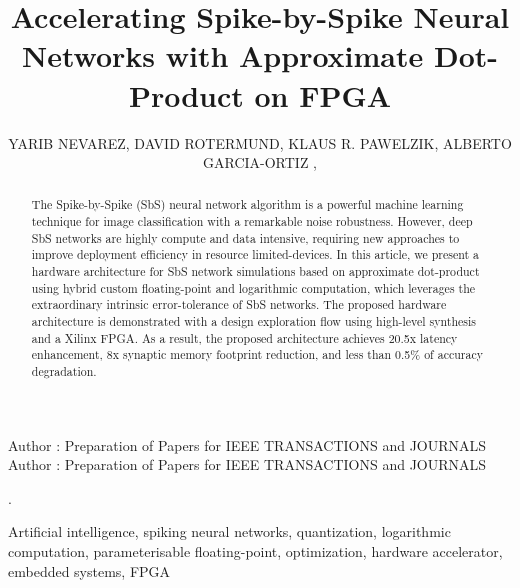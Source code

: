 \title {Accelerating Spike-by-Spike Neural Networks with Approximate Dot-Product on FPGA}

\author{
	\uppercase{Yarib Nevarez},	
	\uppercase{David Rotermund},
	\uppercase{Klaus R. Pawelzik},
	\uppercase{Alberto Garcia-Ortiz} ,
}

\address[1]{Institute of Electrodynamics and Microelectronics, University of Bremen, Bremen 28359, Germany (e-mail: nevarez@item.uni-bremen.de)}

\address[2]{Institute for Theoretical Physics, University of Bremen, Bremen 28359, Germany (e-mail: davrot@@neuro.uni-bremen.de)}

\address[3]{Institute for Theoretical Physics, University of Bremen, Bremen 28359, Germany (e-mail: pawelzik@@neuro.uni-bremen.de)}

\address[4]{Institute of Electrodynamics and Microelectronics, University of Bremen, Bremen 28359, Germany (e-mail: agaracia@item.uni-bremen.de)}


\markboth
{Author \headeretal: Preparation of Papers for IEEE TRANSACTIONS and JOURNALS}
{Author \headeretal: Preparation of Papers for IEEE TRANSACTIONS and JOURNALS}

.

\begin{abstract}
The Spike-by-Spike (SbS) neural network algorithm is a powerful machine learning technique for image classification with a remarkable noise robustness. However, deep SbS networks are highly compute and data intensive, requiring new approaches to improve deployment efficiency in resource limited-devices. In this article, we present a hardware architecture for SbS network simulations based on approximate dot-product using hybrid custom floating-point and logarithmic computation, which leverages the extraordinary intrinsic error-tolerance of SbS networks. The proposed hardware architecture is demonstrated with a design exploration flow using high-level synthesis and a Xilinx FPGA. As a result, the proposed architecture achieves 20.5x latency enhancement, 8x synaptic memory footprint reduction, and less than 0.5\% of accuracy degradation.
	
\end{abstract}

\begin{keywords}
Artificial intelligence, spiking neural networks, quantization, logarithmic computation, parameterisable floating-point, optimization, hardware accelerator, embedded systems, FPGA
\end{keywords}

\titlepgskip=-15pt

\maketitle
